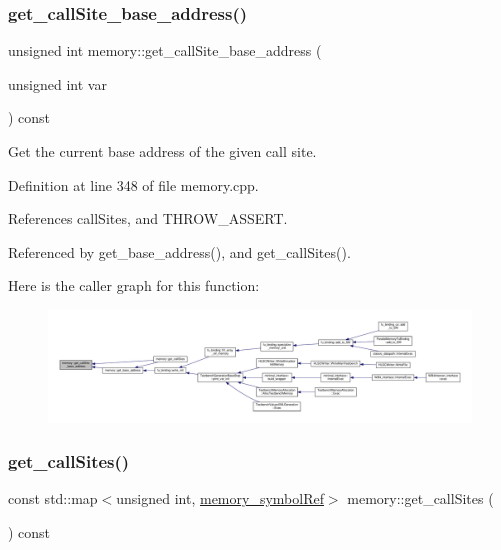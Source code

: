 \subsubsection{\texorpdfstring{get\+\_\+call\+Site\+\_\+base\+\_\+address()}{get\_callSite\_base\_address()}}
{\footnotesize\ttfamily unsigned int memory\+::get\+\_\+call\+Site\+\_\+base\+\_\+address (\begin{DoxyParamCaption}\item[{unsigned int}]{var }\end{DoxyParamCaption}) const}



Get the current base address of the given call site. 



Definition at line 348 of file memory.\+cpp.



References call\+Sites, and T\+H\+R\+O\+W\+\_\+\+A\+S\+S\+E\+RT.



Referenced by get\+\_\+base\+\_\+address(), and get\+\_\+call\+Sites().

Here is the caller graph for this function\+:
\nopagebreak
\begin{figure}[H]
\begin{center}
\leavevmode
\includegraphics[width=350pt]{d8/d99/classmemory_a3848f46ecf3925ab804f51e26661ae19_icgraph}
\end{center}
\end{figure}
\mbox{\label{classmemory_adcab40db7617504ad89b0d11d53c8965}} 
\subsubsection{\texorpdfstring{get\+\_\+call\+Sites()}{get\_callSites()}}
{\footnotesize\ttfamily const std\+::map$<$unsigned int, \hyperlink{memory__symbol_8hpp_af3608dbc27177447c2d777fa712cc82a}{memory\+\_\+symbol\+Ref}$>$ memory\+::get\+\_\+call\+Sites (\begin{DoxyParamCaption}{ }\end{DoxyParamCaption}) const\hspace{0.3cm}{\ttfamily [inline]}}



